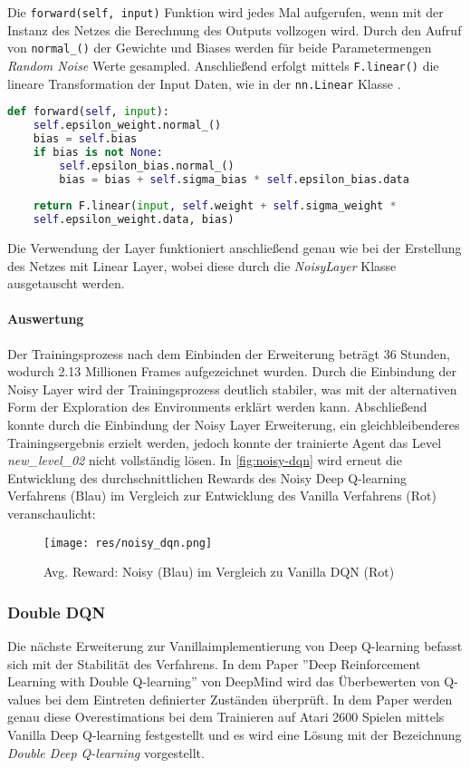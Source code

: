 \documentclass[11pt]{scrartcl}
\begin{document}
Die \lstinline!forward(self, input)! Funktion wird jedes Mal aufgerufen, wenn mit der Instanz
des Netzes die Berechnung des Outputs vollzogen wird. Durch den Aufruf von 
\lstinline!normal_()! der Gewichte und Biases werden für beide Parametermengen 
\textit{Random Noise} Werte gesampled. Anschließend erfolgt mittels \lstinline!F.linear()!
die lineare Transformation der Input Daten, wie in der \lstinline!nn.Linear! Klasse 
\cite[~S.179 ff.]{L2018}.

\begin{lstlisting}[language=Python, caption=\textit{forward()} Funktion Noisy Layer, 
label=lst:noisy_forward]
	def forward(self, input):
	self.epsilon_weight.normal_()
	bias = self.bias
	if bias is not None:
	    self.epsilon_bias.normal_()
	    bias = bias + self.sigma_bias * self.epsilon_bias.data
		
	return F.linear(input, self.weight + self.sigma_weight *
	self.epsilon_weight.data, bias)
\end{lstlisting}

Die Verwendung der Layer funktioniert anschließend genau wie bei der Erstellung des Netzes mit
Linear Layer, wobei diese durch die \textit{NoisyLayer} Klasse ausgetauscht werden.

\paragraph*{Auswertung}
\noindent
\newline
Der Trainingsprozess nach dem Einbinden der Erweiterung beträgt 36 Stunden, wodurch 2.13 Millionen
Frames aufgezeichnet wurden. Durch die Einbindung der Noisy Layer wird der Trainingsprozess
deutlich stabiler, was mit der alternativen Form der Exploration des Environments erklärt werden
kann. Abschließend konnte durch die Einbindung der Noisy Layer Erweiterung, ein
gleichbleibenderes Trainingsergebnis erzielt werden, jedoch konnte der trainierte Agent
das Level \textit{new\_level\_02} nicht vollständig lösen. In \autoref{fig:noisy-dqn}
wird erneut die Entwicklung des durchschnittlichen Rewards des Noisy Deep Q-learning
Verfahrens (Blau) im Vergleich zur Entwicklung des Vanilla Verfahrens (Rot) veranschaulicht:

\begin{figure}[htp]
\centering
\texttt{[image: res/noisy\_dqn.png]}
\caption{Avg. Reward: Noisy (Blau) im Vergleich zu Vanilla DQN (Rot)}
\label{fig:noisy-dqn}
\end{figure}

\subsubsection{Double DQN}
Die nächste Erweiterung zur Vanillaimplementierung von Deep Q-learning befasst sich mit der
Stabilität des Verfahrens. In dem Paper ''Deep Reinforcement Learning with Double Q-learning''
von DeepMind\cite{HGD2015} wird das Überbewerten von Q-values bei dem Eintreten definierter
Zuständen überprüft. In dem Paper werden genau diese Overestimations bei dem Trainieren auf
Atari 2600 Spielen mittels Vanilla Deep Q-learning festgestellt und es wird eine Lösung mit
der Bezeichnung \textit{Double Deep Q-learning} vorgestellt.
\end{document}
